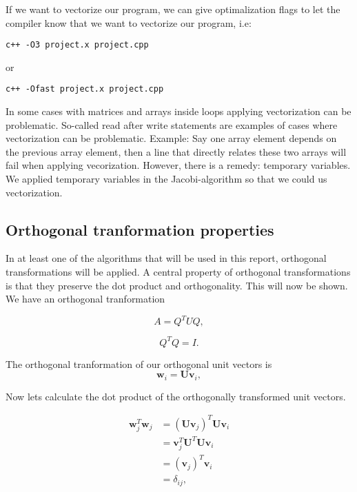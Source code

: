 \documentclass{article}
\begin{document}
If we want to vectorize our program, we can give optimalization flags to let the compiler know that we want to vectorize our program, i.e:
\begin{lstlisting}
c++ -O3 project.x project.cpp
\end{lstlisting}
or 
\begin{lstlisting}
c++ -Ofast project.x project.cpp
\end{lstlisting}

In some cases with matrices and arrays inside loops applying vectorization can be problematic. So-called read after write statements are examples of cases where vectorization can be problematic. Example: Say one array element depends on the previous array element, then a line that directly relates these two arrays will fail when applying vecorization. However, there is a remedy: temporary variables. We applied temporary variables in the Jacobi-algorithm so that we could us vectorization.

\subsection{Orthogonal tranformation properties}
In at least one of the algorithms that will be used in this report, orthogonal transformations will be applied. A central property of orthogonal transformations is that they preserve the dot product and orthogonality. This will now be shown.\\

We have an orthogonal tranformation

\begin{equation}
A = Q^T U Q,
\end{equation}

\begin{equation}
Q^T Q = I.
\end{equation}

The orthogonal tranformation of our orthogonal unit vectors is
\[
\mathbf{w}_i=\mathbf{U}\mathbf{v}_i,
\]

Now lets calculate the dot product of the orthogonally transformed unit vectors.

\begin{subequations} 
	\begin{align}
	\mathbf{w}_j^T \mathbf{w}_j &= (\mathbf{U v}_j)^T \mathbf{U v}_i\\
	&= \mathbf{v}_j^T \mathbf{U}^T \mathbf{U} \mathbf{v}_i \\
	&= (\mathbf{v}_j)^T \mathbf{v}_i\\
	&= \delta_{ij},
	\end{align}
\end{subequations}
\end{document}
